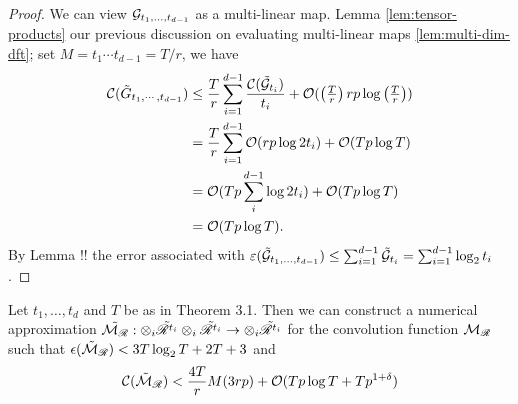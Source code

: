 \begin{proof}
    We can view $\mathcal G_{t_1, \ldots, t_{d-1}}$ as a multi-linear map. Lemma \ref{lem:tensor-products} our previous discussion on evaluating multi-linear maps \eqref{lem:multi-dim-dft}; set $M = t_1\cdots t_{d-1} = T/r$, we have
    \begin{align*}
        \mathcal C(\tilde{G}_{t_1, \cdots, t_{d-1}}) &\leq \frac{T}{r} \sum^{d-1}_{i=1} \frac{\mathcal C(\tilde{\mathcal G}_{t_i})}{t_i} + \mathcal O(\left(\tfrac{T}{r}\right)rp\log \left(\tfrac{T}{r}\right))\\
                                                &= \frac{T}{r}\sum^{d-1}_{i=1}\mathcal O(rp\log 2t_i) + \mathcal O(Tp \log T)\\
                                                &= \mathcal O(Tp \sum_i^{d-1}\log 2t_i) + \mathcal O(Tp \log T)\\
                                                &= \mathcal O(Tp \log T).
    \end{align*}
    By Lemma !!  the error associated with $\varepsilon(\tilde{\mathcal G}_{t_1, \ldots, t_{d-1}}) \le \sum_{i=1}^{d-1}\tilde{\mathcal G}_{t_i} = \sum_{i=1}^{d-1} \log_2 t_i$.
\end{proof}

\begin{proposition}
    Let $t_1, \ldots, t_d$ and $T$ be as in Theorem 3.1. Then we can construct a numerical approximation $\tilde{\mathcal M_{\mathscr{R}}}: \otimes_i \tilde{\mathscr{R}^{t_i}} \otimes_i \tilde{\mathscr{R}^{t_i}} \to \otimes_i \tilde{\mathscr{R}^{t_i}}$ for the convolution function $\mathcal M_{\mathscr{R}}$ such that $\epsilon(\tilde{\mathcal M}_{\mathscr{R}}) < 3T \log_2 T + 2T + 3$ and
    \[
        \mathcal C(\tilde{\mathcal M}_{\mathscr{R}}) < \frac{4T}{r}M(3rp) + \mathcal O(Tp \log T + T p^{1 + \delta})
    \]
\end{proposition}


